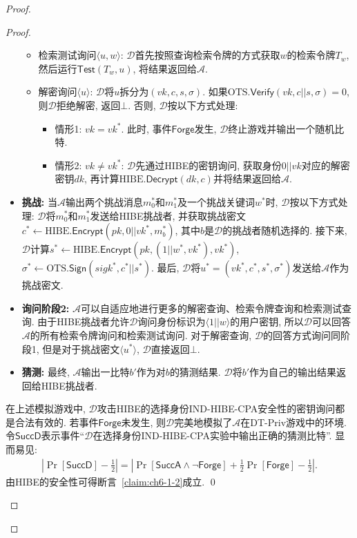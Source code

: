 \begin{proof}
\begin{proof}
\begin{trivlist}
\begin{itemize}
\begin{itemize}
			\item 检索测试询问$\langle u, w \rangle$: $\mathcal{D}$首先按照查询检索令牌的方式获取$w$的检索令牌$T_w$, 然后运行$\mathsf{Test}(T_w, u)$, 将结果返回给$\mathcal{A}$.

			\item 解密询问$\langle u \rangle$: $\mathcal{D}$将$u$拆分为$(vk, c, s, \sigma)$.
				如果$\text{OTS}.\mathsf{Verify}(vk, c||s, \sigma) = 0$, 则$\mathcal{D}$拒绝解密, 返回$\bot$. 否则, $\mathcal{D}$按以下方式处理:
				\vspace{-0.5em}
				\begin{itemize} \itemsep 1pt \parskip 0pt \parsep 0pt
					\item 情形1: $vk = vk^*$. 此时, 事件$\mathsf{Forge}$发生, $\mathcal{D}$终止游戏并输出一个随机比特.

					\item 情形2: $vk \neq vk^*$: $\mathcal{D}$先通过HIBE的密钥询问, 获取身份$0||vk$对应的解密密钥$dk$, 再计算$\text{HIBE}.\mathsf{Decrypt}(dk, c)$并将结果返回给$\mathcal{A}$.
				\end{itemize}
		\end{itemize}

	\item \textbf{挑战:} 当$\mathcal{A}$输出两个挑战消息$m_0^*$和$m_1^*$及一个挑战关键词$w^*$时, $\mathcal{D}$按以下方式处理: $\mathcal{D}$将$m_0^*$和$m_1^*$发送给HIBE挑战者, 并获取挑战密文$c^* \leftarrow \text{HIBE}.\mathsf{Encrypt}(pk, 0||vk^*, m_b^*)$, 其中$b$是$\mathcal{D}$的挑战者随机选择的. 接下来, $\mathcal{D}$计算$s^* \leftarrow \text{HIBE}.\mathsf{Encrypt}(pk, (1||w^*, vk^*), vk^*)$, $\sigma^* \leftarrow \text{OTS}.\mathsf{Sign}(sigk^*, c^*||s^*)$. 
		最后, $\mathcal{D}$将$u^* = (vk^*, c^*, s^*, \sigma^*)$发送给$\mathcal{A}$作为挑战密文.

	\item \textbf{询问阶段2:} $\mathcal{A}$可以自适应地进行更多的解密查询、检索令牌查询和检索测试查询. 由于HIBE挑战者允许$\mathcal{D}$询问身份标识为$\langle 1||w \rangle$的用户密钥, 所以$\mathcal{D}$可以回答$\mathcal{A}$的所有检索令牌询问和检索测试询问. 对于解密查询, $\mathcal{D}$的回答方式询问同阶段1, 但是对于挑战密文$\langle u^*\rangle$, $\mathcal{D}$直接返回$\bot$.

	\item \textbf{猜测:} 最终, $\mathcal{A}$输出一比特$b'$作为对$b$的猜测结果. $\mathcal{D}$将$b'$作为自己的输出结果返回给HIBE挑战者. 	
\end{itemize}

在上述模拟游戏中, $\mathcal{D}$攻击HIBE的选择身份IND-HIBE-CPA安全性的密钥询问都是合法有效的. 若事件$\mathsf{Forge}$未发生, 则$\mathcal{D}$完美地模拟了$\mathcal{A}$在DT-Priv游戏中的环境. 令$\mathsf{SuccD}$表示事件``$\mathcal{D}$在选择身份IND-HIBE-CPA实验中输出正确的猜测比特''. 显而易见: 
\[
\begin{array}{l}
	\left|\Pr[\mathsf{SuccD}]-\frac{1}{2}\right|  =  \left|\Pr[\mathsf{SuccA} \wedge \neg\mathsf{Forge}] + \frac{1}{2}\Pr[\mathsf{Forge}] -\frac{1}{2}\right|.
\end{array}
\]
由HIBE的安全性可得断言~\ref{claim:ch6-1-2}成立. \qed
\end{trivlist}


\end{proof}
\end{proof}
